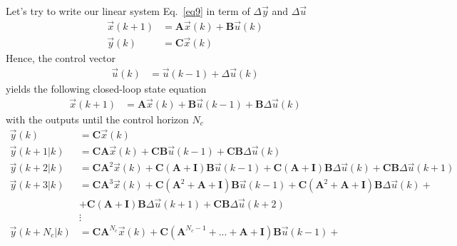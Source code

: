 \documentclass[12pt,a4paper,oneside]{book}
\begin{document}
\begin{onehalfspace}
Let's try to write our linear system Eq.~\eqref{eq9} in term of $\Delta\vec{y}$ 
and $\Delta\vec{u}$
\begin{equation}\label{eq9}
	\begin{aligned}
		\vec{x}(k+1) &= \mathbf{A}\vec{x}(k) + \mathbf{B}\vec{u}(k) \\[6pt]
		\vec{y}(k) &= \mathbf{C}\vec{x}(k)
	\end{aligned}
\end{equation}
Hence, the control vector
\begin{equation}\label{eq10}
	\begin{aligned}
		\vec{u}(k) &= \vec{u}(k-1) + \Delta\vec{u}(k)
	\end{aligned}
\end{equation}
yields the following closed-loop state equation
\begin{equation}\label{eq11}
	\begin{aligned}
		\vec{x}(k+1) &= \mathbf{A}\vec{x}(k)+\mathbf{B}\vec{u}(k-1) + 
		\mathbf{B}\Delta\vec{u}(k)
	\end{aligned}
\end{equation}
with the outputs until the control horizon $N_c$
\begin{equation}\label{eq12}
	\begin{aligned}
		\vec{y}(k) &= \mathbf{C}\vec{x}(k)\\[6pt]
		\vec{y}(k+1|k) &= 
		\mathbf{C}\mathbf{A}\vec{x}(k)+\mathbf{C}\mathbf{B}\vec{u}(k-1) + 
		\mathbf{C}\mathbf{B}\Delta\vec{u}(k)\\[6pt]
		\vec{y}(k+2|k) &= \mathbf{C}\mathbf{A}^2\vec{x}(k)+\mathbf{C}\left( 
		\mathbf{A}+\mathbf{I}\right) \mathbf{B}\vec{u}(k-1) + \mathbf{C}\left( 
		\mathbf{A}+\mathbf{I}\right)\mathbf{B}\Delta\vec{u}(k)+ 
		\mathbf{C}\mathbf{B}\Delta\vec{u}(k+1)\\[6pt]
		\vec{y}(k+3|k) &= \mathbf{C}\mathbf{A}^3\vec{x}(k)+\mathbf{C}\left( 
		\mathbf{A}^2+\mathbf{A}+\mathbf{I}\right) \mathbf{B}\vec{u}(k-1) + 
		\mathbf{C}\left( 
		\mathbf{A}^2+\mathbf{A}+\mathbf{I}\right)\mathbf{B}\Delta\vec{u}(k)+ 
		\\[6pt]
		&+\mathbf{C}\left( 
		\mathbf{A}+\mathbf{I}\right)\mathbf{B}\Delta\vec{u}(k+1)+\mathbf{C}\mathbf{B}\Delta\vec{u}(k+2)\\[6pt]
		&\vdots \\[6pt]
		\vec{y}(k+N_c|k) &= 
		\mathbf{C}\mathbf{A}^{N_c}\vec{x}(k)+\mathbf{C}\left( 
		\mathbf{A}^{N_c-1}+...+\mathbf{A}+\mathbf{I}\right) 
		\mathbf{B}\vec{u}(k-1) + \\[6pt]

\end{aligned}
\end{equation}
\end{onehalfspace}
\end{document}

